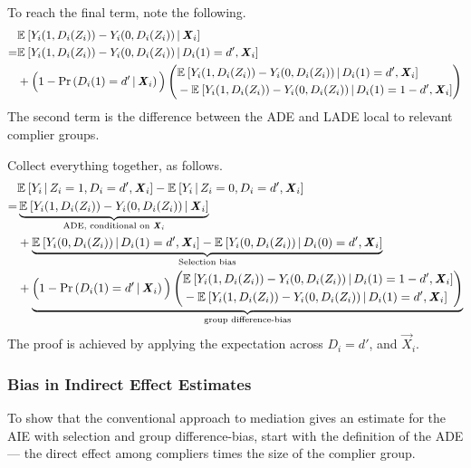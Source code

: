 To reach the final term, note the following.
\begin{align*}
    &\mathbb{E}_{} \left[ Y_i(1, D_i(Z_i)) - Y_i(0, D_i(Z_i)) \, \middle\vert \, \boldsymbol{\mathit{X}}_i \right] \\    
    =& \mathbb{E}_{} \left[ Y_i(1, D_i(Z_i)) - Y_i(0, D_i(Z_i)) \, \middle\vert \, D_i(1) = d', \boldsymbol{\mathit{X}}_i \right] \\
    &+ \Big(1 - \Pr\left( D_i(1) = d' \, \middle\vert \, \boldsymbol{\mathit{X}}_i \right)\Big)
    \left( \begin{aligned}
        &\mathbb{E}_{} \left[ Y_i(1, D_i(Z_i)) - Y_i(0, D_i(Z_i)) \, \middle\vert \, D_i(1) = d', \boldsymbol{\mathit{X}}_i \right] \\ 
        & - \mathbb{E}_{} \left[ Y_i(1, D_i(Z_i)) - Y_i(0, D_i(Z_i)) \, \middle\vert \, D_i(1) = 1 - d', \boldsymbol{\mathit{X}}_i \right]
    \end{aligned} \right) 
\end{align*}
The second term is the difference between the ADE and LADE local to relevant complier groups.

Collect everything together, as follows.
\begin{align*}
    &  \mathbb{E}_{} \left[ Y_i \, \middle\vert \, Z_i = 1, D_i = d', \boldsymbol{\mathit{X}}_i \right]
    - \mathbb{E}_{} \left[ Y_i \, \middle\vert \, Z_i = 0, D_i = d', \boldsymbol{\mathit{X}}_i \right] \\
    =& \underbrace{
        \mathbb{E}_{} \left[ Y_i(1, D_i(Z_i)) - Y_i(0, D_i(Z_i)) \, \middle\vert \, \boldsymbol{\mathit{X}}_i \right]}_{
            \text{ADE, conditional on }\boldsymbol{\mathit{X}}_i} \\
    &+ \underbrace{
        \mathbb{E}_{} \left[ Y_i(0, D_i(Z_i)) \, \middle\vert \, D_i(1) = d', \boldsymbol{\mathit{X}}_i \right]
            - \mathbb{E}_{} \left[ Y_i(0, D_i(Z_i)) \, \middle\vert \, D_i(0) = d', \boldsymbol{\mathit{X}}_i \right]}_{
                \text{Selection bias}} \\
    &+ \underbrace{\Big(1 - \Pr\left( D_i(1) = d' \, \middle\vert \, \boldsymbol{\mathit{X}}_i \right)\Big)
    \left( \begin{aligned}
        &\mathbb{E}_{} \left[ Y_i(1, D_i(Z_i)) - Y_i(0, D_i(Z_i)) \, \middle\vert \, D_i(1) = 1 - d', \boldsymbol{\mathit{X}}_i \right] \\ 
        & - \mathbb{E}_{} \left[ Y_i(1, D_i(Z_i)) - Y_i(0, D_i(Z_i)) \, \middle\vert \, D_i(1) = d', \boldsymbol{\mathit{X}}_i \right]
    \end{aligned} \right)}_{
        \text{group difference-bias}}
\end{align*}
The proof is achieved by applying the expectation across $D_i = d'$, and $\vec X_i$.

\subsubsection{Bias in Indirect Effect Estimates}
To show that the conventional approach to mediation gives an estimate for the AIE with selection and group difference-bias, start with the definition of the ADE --- the direct effect among compliers times the size of the complier group.

